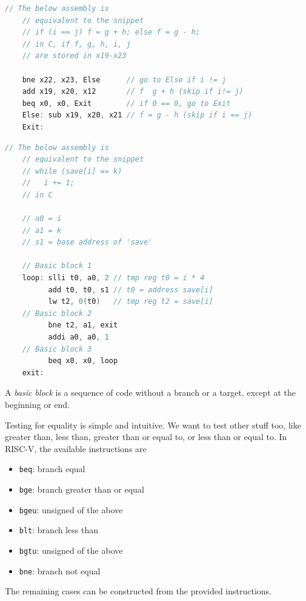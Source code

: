 \begin{lstlisting}[language=C, caption={Conditional Example}]
    // The below assembly is 
    // equivalent to the snippet
    // if (i == j) f = g + h; else f = g - h;
    // in C, if f, g, h, i, j
    // are stored in x19-x23

    bne x22, x23, Else      // go to Else if i != j
    add x19, x20, x12       // f  g + h (skip if i!= j)
    beq x0, x0, Exit        // if 0 == 0, go to Exit
    Else: sub x19, x20, x21 // f = g - h (skip if i == j)
    Exit:
\end{lstlisting}

\begin{lstlisting}[language=C, caption={Loop Example}]
    // The below assembly is 
    // equivalent to the snippet
    // while (save[i] == k)
    //   i += 1;
    // in C

    // a0 = i
    // a1 = k
    // s1 = base address of 'save'

    // Basic block 1
    loop: slli t0, a0, 2 // tmp reg t0 = i * 4
          add t0, t0, s1 // t0 = address save[i]
          lw t2, 0(t0)   // tmp reg t2 = save[i]
    // Basic block 2
          bne t2, a1, exit
          addi a0, a0, 1
    // Basic block 3
          beq x0, x0, loop
    exit:
\end{lstlisting}

A \emph{basic block} is a sequence of
code without a branch or a target,
except at the beginning or end.

Testing for equality is simple and
intuitive. We want to test other
stuff too, like greater than, less than,
greater than or equal to, or
less than or equal to. In RISC-V,
the available instructions are
\begin{itemize}
    \item \texttt{beq}: branch equal
    \item \texttt{bge}: branch greater than or equal
    \item \texttt{bgeu}: unsigned of the above
    \item \texttt{blt}: branch less than
    \item \texttt{bgtu}: unsigned of the above
    \item \texttt{bne}: branch not equal
\end{itemize}
The remaining cases can be constructed
from the provided instructions.